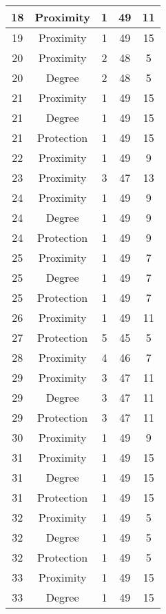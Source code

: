 \documentclass[results.tex]{subfiles}
\begin{document}
\begin{center}
\begin{tabular}{| c || c | c | c | c |}
    \hline
    18 & Proximity & 1 & 49 & 11 \\ 
    \hline
    19 & Proximity & 1 & 49 & 15 \\ 
    \hline
    20 & Proximity & 2 & 48 & 5 \\ 
    \hline
    20 & Degree & 2 & 48 & 5 \\ 
    \hline
    21 & Proximity & 1 & 49 & 15 \\ 
    \hline
    21 & Degree & 1 & 49 & 15 \\ 
    \hline
    21 & Protection & 1 & 49 & 15 \\ 
    \hline
    22 & Proximity & 1 & 49 & 9 \\ 
    \hline
    23 & Proximity & 3 & 47 & 13 \\ 
    \hline
    24 & Proximity & 1 & 49 & 9 \\ 
    \hline
    24 & Degree & 1 & 49 & 9 \\ 
    \hline
    24 & Protection & 1 & 49 & 9 \\ 
    \hline
    25 & Proximity & 1 & 49 & 7 \\ 
    \hline
    25 & Degree & 1 & 49 & 7 \\ 
    \hline
    25 & Protection & 1 & 49 & 7 \\ 
    \hline
    26 & Proximity & 1 & 49 & 11 \\ 
    \hline
    27 & Protection & 5 & 45 & 5 \\ 
    \hline
    28 & Proximity & 4 & 46 & 7 \\ 
    \hline
    29 & Proximity & 3 & 47 & 11 \\ 
    \hline
    29 & Degree & 3 & 47 & 11 \\ 
    \hline
    29 & Protection & 3 & 47 & 11 \\ 
    \hline
    30 & Proximity & 1 & 49 & 9 \\ 
    \hline
    31 & Proximity & 1 & 49 & 15 \\ 
    \hline
    31 & Degree & 1 & 49 & 15 \\ 
    \hline
    31 & Protection & 1 & 49 & 15 \\ 
    \hline
    32 & Proximity & 1 & 49 & 5 \\ 
    \hline
    32 & Degree & 1 & 49 & 5 \\ 
    \hline
    32 & Protection & 1 & 49 & 5 \\ 
    \hline
    33 & Proximity & 1 & 49 & 15 \\ 
    \hline
    33 & Degree & 1 & 49 & 15 \\ 

\end{tabular}
\end{center}
\end{document}

